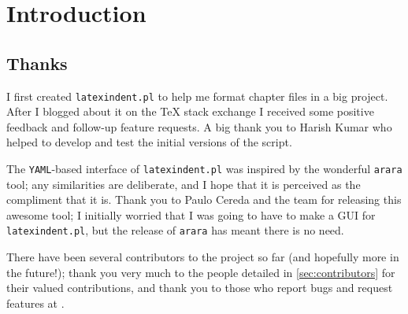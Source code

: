 \section{Introduction}
\subsection{Thanks}
	I first created \texttt{latexindent.pl} to help me format chapter files
	in a big project. After I blogged about it on the
	\TeX{} stack exchange \cite{cmhblog} I received some positive feedback and
	follow-up feature requests. A big thank you to Harish Kumar who
	helped to develop and test the initial versions of the script.

	The \texttt{YAML}-based interface of \texttt{latexindent.pl} was inspired
	by the wonderful \texttt{arara} tool; any similarities are deliberate, and
	I hope that it is perceived as the compliment that it is. Thank you to Paulo Cereda and the
	team for releasing this awesome tool; I initially worried that I was going to
	have to make a GUI for \texttt{latexindent.pl}, but the release of \texttt{arara}
	has meant there is no need.

	There have been several contributors to the project so far (and hopefully more in
	the future!); thank you very much to the people detailed in \vref{sec:contributors}
	for their valued contributions, and thank you to those who report bugs and request features
	at \cite{latexindent-home}.

